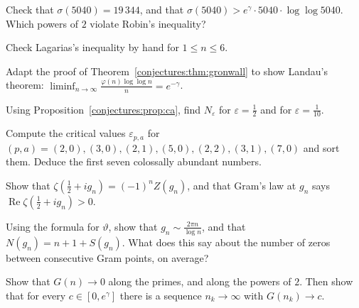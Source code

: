\begin{exercise}[$\star$]\label{conjectures:ex:robinfails}
Check that $\sigma(5040)=19\,344$, and that $\sigma(5040)>e^\gamma\cdot5040\cdot\log\log5040$. Which powers of $2$ violate Robin's inequality?
\end{exercise}

\begin{exercise}[$\star$]\label{conjectures:ex:lagsmall}
Check Lagarias's inequality by hand for $1\le n\le6$.
\end{exercise}

\begin{exercise}[$\star\star$]\label{conjectures:ex:landauphi}
Adapt the proof of Theorem~\ref{conjectures:thm:gronwall} to show Landau's theorem: $\displaystyle\liminf_{n\to\infty}\frac{\varphi(n)\log\log n}n=e^{-\gamma}$.
\end{exercise}

\begin{exercise}[$\star$]\label{conjectures:ex:cafirst}
Using Proposition~\ref{conjectures:prop:ca}, find $N_\varepsilon$ for $\varepsilon=\frac12$ and for $\varepsilon=\frac1{10}$.
\end{exercise}

\begin{exercise}[$\star\star$]\label{conjectures:ex:cacritical}
Compute the critical values $\varepsilon_{p,a}$ for $(p,a)=(2,0),(3,0),(2,1),(5,0),(2,2),(3,1),(7,0)$ and sort them. Deduce the first seven colossally abundant
numbers.
\end{exercise}

\begin{exercise}[$\star$]\label{conjectures:ex:Zgram}
Show that $\zeta(\frac12+ig_n)=(-1)^nZ(g_n)$, and that Gram's law at $g_n$ says $\operatorname{Re}\zeta(\frac12+ig_n)>0$.
\end{exercise}

\begin{exercise}[$\star\star$]\label{conjectures:ex:gramasym}
Using the formula for $\vartheta$, show that $g_n\sim\frac{2\pi n}{\log n}$, and that $N(g_n)=n+1+S(g_n)$. What does this say about the number of zeros between
consecutive Gram points, on average?
\end{exercise}

\begin{exercise}[$\star\star$]\label{conjectures:ex:gronwallsub}
Show that $G(n)\to0$ along the primes, and along the powers of $2$. Then show that for every $c\in[0,e^\gamma]$ there is a sequence $n_k\to\infty$ with
$G(n_k)\to c$.
\end{exercise}

